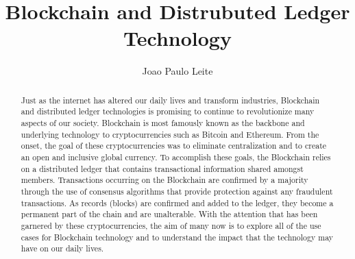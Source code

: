 \title{Blockchain and Distrubuted Ledger Technology}


\author{Joao Paulo Leite}


\renewcommand{\shortauthors}{J. Leite}


\begin{abstract}
Just as the internet has altered our daily lives and transform industries, Blockchain and distributed ledger technologies is promising to continue to revolutionize many aspects of our society.  Blockchain is most famously known as the backbone and underlying technology to cryptocurrencies such as Bitcoin and Ethereum.  From the onset, the goal of these cryptocurrencies was to eliminate centralization and to create an open and inclusive global currency. To accomplish these goals, the Blockchain relies on a distributed ledger that contains transactional information shared amongst members. Transactions occurring on the Blockchain are confirmed by a majority through the use of consensus algorithms that provide protection against any fraudulent transactions. As records (blocks) are confirmed and added to the ledger, they become a permanent part of the chain and are unalterable. With the attention that has been garnered by these cryptocurrencies, the aim of many now is to explore all of the use cases for Blockchain technology and to understand the impact that the technology may have on our daily lives. 

\end{abstract}



\maketitle


